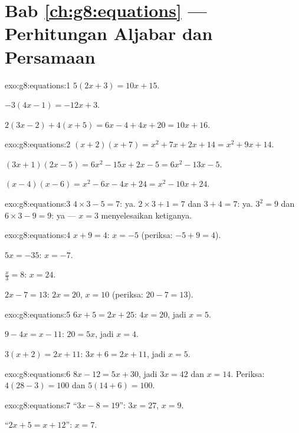 \section*{Bab \ref{ch:g8:equations} --- Perhitungan Aljabar dan Persamaan}

\begin{solution}{exo:g8:equations:1}
$5(2x + 3) = 10x + 15$.

$-3(4x - 1) = -12x + 3$.

$2(3x - 2) + 4(x + 5) = 6x - 4 + 4x + 20 = 10x + 16$.
\end{solution}

\begin{solution}{exo:g8:equations:2}
$(x+2)(x+7) = x^2 + 7x + 2x + 14 = x^2 + 9x + 14$.

$(3x+1)(2x-5) = 6x^2 - 15x + 2x - 5 = 6x^2 - 13x - 5$.

$(x-4)(x-6) = x^2 - 6x - 4x + 24 = x^2 - 10x + 24$.
\end{solution}

\begin{solution}{exo:g8:equations:3}
$4 \times 3 - 5 = 7$: ya. \quad
$2 \times 3 + 1 = 7$ dan $3 + 4 = 7$: ya. \quad
$3^2 = 9$ dan $6 \times 3 - 9 = 9$: ya --- $x = 3$ menyelesaikan
ketiganya.
\end{solution}

\begin{solution}{exo:g8:equations:4}
$x + 9 = 4$: $x = -5$ (periksa: $-5 + 9 = 4$).

$5x = -35$: $x = -7$.

$\frac x3 = 8$: $x = 24$.

$2x - 7 = 13$: $2x = 20$, $x = 10$ (periksa: $20 - 7 = 13$).
\end{solution}

\begin{solution}{exo:g8:equations:5}
$6x + 5 = 2x + 25$: $4x = 20$, jadi $x = 5$.

$9 - 4x = x - 11$: $20 = 5x$, jadi $x = 4$.

$3(x + 2) = 2x + 11$: $3x + 6 = 2x + 11$, jadi $x = 5$.
\end{solution}

\begin{solution}{exo:g8:equations:6}
$8x - 12 = 5x + 30$, jadi $3x = 42$ dan $x = 14$. Periksa:
$4(28 - 3) = 100$ dan $5(14 + 6) = 100$.
\end{solution}

\begin{solution}{exo:g8:equations:7}
``$3x - 8 = 19$'': $3x = 27$, $x = 9$.

``$2x + 5 = x + 12$'': $x = 7$.
\end{solution}

